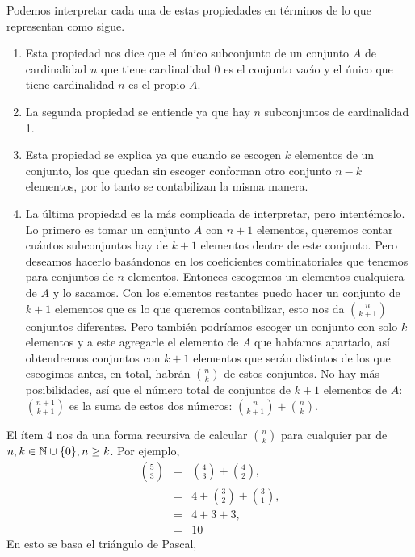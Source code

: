 Podemos interpretar cada una de estas propiedades en términos de lo que representan como sigue.
\begin{enumerate}
\item Esta propiedad nos dice que el \'unico subconjunto de un conjunto $A$ de cardinalidad $n$ que tiene cardinalidad 0 es el conjunto vac\'{\i}o y el \'unico que tiene cardinalidad $n$ es el propio $A$.
\item La segunda propiedad se entiende ya que hay $n$ subconjuntos de cardinalidad 1.
\item Esta propiedad se explica ya que cuando se escogen $k$ elementos de un conjunto, los que quedan sin escoger conforman otro conjunto $n-k$ elementos, por lo tanto se contabilizan la misma manera.
\item La última propiedad es la más complicada de interpretar, pero intentémoslo.
  Lo primero es tomar un conjunto $A$ con $n+1$ elementos, queremos contar cuántos subconjuntos hay de $k+1$ elementos dentre de este conjunto.
  Pero deseamos hacerlo basándonos en los coeficientes combinatoriales que tenemos para conjuntos de $n$ elementos.
  Entonces escogemos un elementos cualquiera de $A$ y lo sacamos.
  Con los elementos restantes puedo hacer un conjunto de $k+1$ elementos que es lo que queremos contabilizar, esto nos da ${n\choose k+1}$ conjuntos diferentes.
  Pero también podríamos escoger un conjunto con solo $k$ elementos y a este agregarle el elemento de $A$ que habíamos apartado, así obtendremos conjuntos con $k+1$ elementos que serán distintos de los que escogimos antes, en total, habrán ${n\choose k}$ de estos conjuntos.
  No hay más posibilidades, así que el número total de conjuntos de $k+1$ elementos de $A$: ${n+1\choose k+1}$ es la suma de estos dos números: ${n\choose k+1}+{n\choose k}$.
\end{enumerate}
    
El ítem 4 nos da una forma recursiva de calcular $\binom{n}{k}$ para cualquier
par de $n,k \in \mathbb{N} \cup \{0\}, n \ge k$. Por ejemplo,
\begin{eqnarray*}
  \binom{5}{3} &=& \binom{4}{3} + \binom {4}{2},\\
  &=& 4 + \binom{3}{2} + \binom{3}{1},\\
  &=& 4 + 3 + 3,\\
  &=& 10
\end{eqnarray*}
En esto se basa el tri\'angulo de Pascal,

